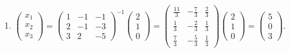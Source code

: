 	 \paragraph{} %
		 \begin{enumerate}
			 \item %
			       $\begin{pmatrix}
					       x_1 \\
					       x_2 \\
					       x_3
				       \end{pmatrix} = \begin{pmatrix}
					       1 & -1 & -1 \\
					       2 & -1 & -3 \\
					       3 & 2  & -5
				       \end{pmatrix}^{-1}
				       \begin{pmatrix}
					       2 \\
					       1 \\
					       0
				       \end{pmatrix} = \begin{pmatrix}
					       \frac{11}{3} & -\frac{7}{3} & \frac{2}{3} \\
					       \frac{1}{3}  & -\frac{2}{3} & \frac{1}{3} \\
					       \frac{7}{3}  & -\frac{5}{3} & \frac{1}{3}
				       \end{pmatrix}
				       \begin{pmatrix}
					       2 \\
					       1 \\
					       0
				       \end{pmatrix} = \begin{pmatrix}
					       5 \\
					       0 \\
					       3
				       \end{pmatrix}$.


\end{enumerate}

